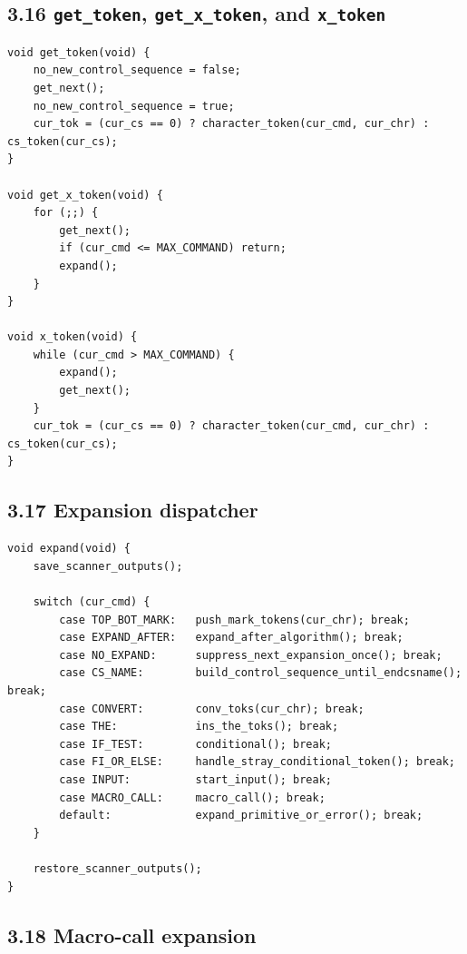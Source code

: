 \documentclass[11pt]{article}
\begin{document}
\subsection{\texorpdfstring{3.16 \texttt{get\_token},
\texttt{get\_x\_token}, and
\texttt{x\_token}}{3.16 get\_token, get\_x\_token, and x\_token}}\label{get_token-get_x_token-and-x_token}

\begin{verbatim}
void get_token(void) {
    no_new_control_sequence = false;
    get_next();
    no_new_control_sequence = true;
    cur_tok = (cur_cs == 0) ? character_token(cur_cmd, cur_chr) : cs_token(cur_cs);
}

void get_x_token(void) {
    for (;;) {
        get_next();
        if (cur_cmd <= MAX_COMMAND) return;
        expand();
    }
}

void x_token(void) {
    while (cur_cmd > MAX_COMMAND) {
        expand();
        get_next();
    }
    cur_tok = (cur_cs == 0) ? character_token(cur_cmd, cur_chr) : cs_token(cur_cs);
}
\end{verbatim}

\subsection{3.17 Expansion dispatcher}\label{expansion-dispatcher}

\begin{verbatim}
void expand(void) {
    save_scanner_outputs();

    switch (cur_cmd) {
        case TOP_BOT_MARK:   push_mark_tokens(cur_chr); break;
        case EXPAND_AFTER:   expand_after_algorithm(); break;
        case NO_EXPAND:      suppress_next_expansion_once(); break;
        case CS_NAME:        build_control_sequence_until_endcsname(); break;
        case CONVERT:        conv_toks(cur_chr); break;
        case THE:            ins_the_toks(); break;
        case IF_TEST:        conditional(); break;
        case FI_OR_ELSE:     handle_stray_conditional_token(); break;
        case INPUT:          start_input(); break;
        case MACRO_CALL:     macro_call(); break;
        default:             expand_primitive_or_error(); break;
    }

    restore_scanner_outputs();
}
\end{verbatim}

\subsection{3.18 Macro-call expansion}\label{macro-call-expansion}
\end{document}
